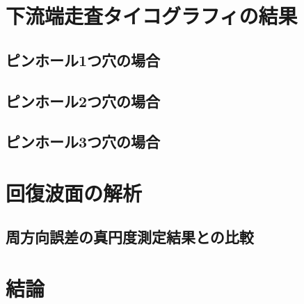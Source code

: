 \section{下流端走査タイコグラフィの結果}
\subsection{ピンホール1つ穴の場合}
\subsection{ピンホール2つ穴の場合}
\subsection{ピンホール3つ穴の場合}

\clearpage
\newpage

\section{回復波面の解析}
\subsection{周方向誤差の真円度測定結果との比較}

\section{結論}
\label{chap5_conclusion}



